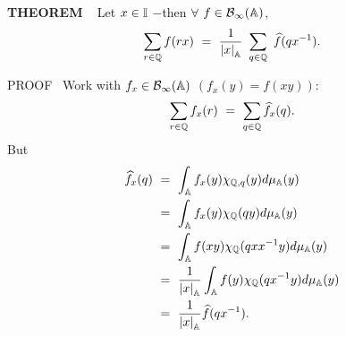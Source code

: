 \begin{x}{\small\bf THEOREM} \ %
Let $x \in \mathbb{I}$ $-$then $\forall$ $f \in \mathcal{B}_\infty(\mathbb{A})$,
\[
\sum_{r \in \mathbb{Q}} f(rx) \ =\  \frac{1}{\left\vert x\right\vert_{\mathbb{A}}} \  \sum_{q \in \mathbb{Q}} \  \widehat{f}(qx^{-1}).
\]

\vspace{0.1cm}

PROOF \  
Work with $f_x \in \mathcal{B}_\infty(\mathbb{A})$ $(f_x(y) = f(xy)):$
\[
\sum_{r \in \mathbb{Q}} f_x(r) \ =\  \sum_{q \in \mathbb{Q}} \widehat{f}_x(q).
\]
But
\begin{align*}
\widehat{f}_x(q)  \ 	
&=\  \int_{\mathbb{A}} f_x(y) \chi_{\mathbb{Q}, q}(y) d\mu_{\mathbb{A}}(y) \\
&=\  \int_{\mathbb{A}} f_x(y) \chi_{\mathbb{Q}}(qy) d\mu_{\mathbb{A}}(y) \\
&=\  \int_{\mathbb{A}} f(xy) \chi_{\mathbb{Q}}(qxx^{-1}y) d\mu_{\mathbb{A}}(y) \\
&=\  \frac{1}{\left\vert x\right\vert_{\mathbb{A}}} \int_{\mathbb{A}} f(y) \chi_{\mathbb{Q}}(qx^{-1}y) d\mu_{\mathbb{A}}(y) \\
&=\  \frac{1}{\left\vert x\right\vert_{\mathbb{A}}} \widehat{f}(qx^{-1}).
\end{align*}\\
\end{x}





















